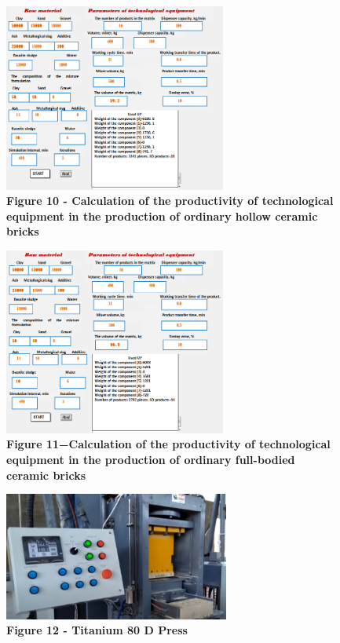 \begin{figure}[H]
	\centering
	\includegraphics[width=0.65\textwidth]{assets/276}
	\caption*{\bfseries Figure 10 - Calculation of the productivity of technological
	equipment in the production of ordinary hollow ceramic bricks}
\end{figure}



\begin{figure}[H]
	\centering
	\includegraphics[width=0.65\textwidth]{assets/277}
	\caption*{\bfseries Figure 11−Calculation of the productivity of technological
	equipment in the production of ordinary full-bodied ceramic bricks}
\end{figure}



\begin{figure}[H]
	\centering
	\includegraphics[width=0.66\textwidth]{assets/278}
	\caption*{\bfseries Figure 12 - Titanium 80 D Press}
\end{figure}

